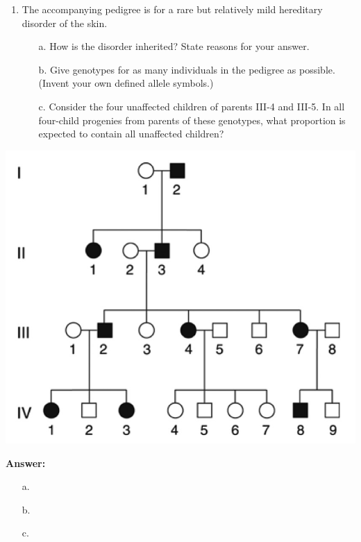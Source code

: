 \documentclass[11pt,]{article}
\providecommand{\tightlist}{%
  \setlength{\itemsep}{0pt}\setlength{\parskip}{0pt}}
\begin{document}
\begin{blackbox}

\begin{enumerate}
\def\labelenumi{\arabic{enumi}.}
\setcounter{enumi}{49}
\tightlist
\item
  The accompanying pedigree is for a rare but relatively mild hereditary
  disorder of the skin.

  \begin{enumerate} 
   \item[a.]{ How is the disorder inherited? State reasons for your answer. } 
   \item[b.]{ Give genotypes for as many individuals in the pedigree as possible. (Invent your own defined allele symbols.) } 
   \item[c.]{ Consider the four unaffected children of parents III-4 and III-5. In all four-child progenies from parents of these genotypes, what proportion is expected to contain all unaffected children? } 
   \end{enumerate}
\end{enumerate}

\begin{center}\includegraphics[width=0.35\linewidth,]{input/50pedigree} \end{center}

\textbf{Answer:}

\begin{enumerate} 
 \item[a.]{  } 
 \item[b.]{  } 
 \item[c.]{  } 
 \end{enumerate}

\end{blackbox}
\end{document}
